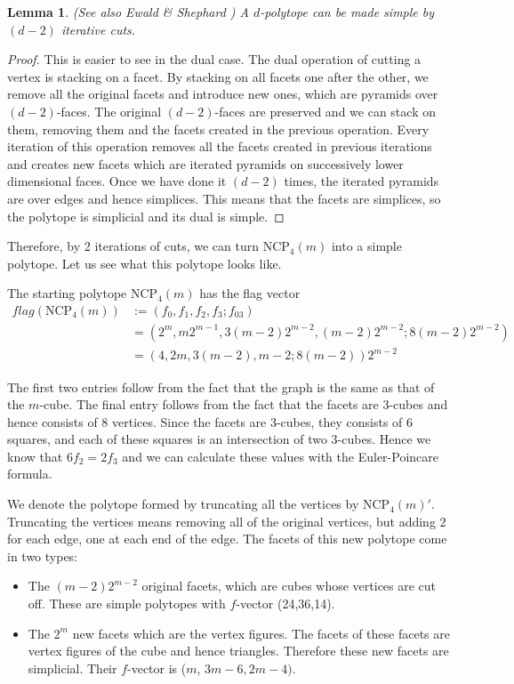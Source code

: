 \documentclass[a4paper,12pt]{book}
\theoremstyle{plain}
\newtheorem{lemma}[theorem]{Lemma}
\theoremstyle{definition}
\newcommand\NC{\textrm{NCP}}
\begin{document}
 

\begin{lemma}
(See also Ewald \& Shephard \cite{EwSh}) A $d$-polytope can be made simple 
by $(d-2)$ iterative cuts.
\end{lemma}

\begin{proof}
This is easier to see in the dual case. The dual operation of cutting a vertex 
is stacking on a facet. By stacking on all facets one after the other, we 
remove all the original facets and introduce new ones, which are pyramids over 
$(d-2)$-faces. The original $(d-2)$-faces are preserved and we can stack on 
them, removing them and the facets created in the previous operation. Every 
iteration of this operation removes all the facets created in previous 
iterations and creates new facets which are iterated pyramids on successively 
lower dimensional faces. Once we have done it $(d-2)$ times, the iterated 
pyramids are over edges and hence simplices. This means that the facets are 
simplices, so the polytope is simplicial and its dual is simple.
\end{proof}

Therefore, by 2 iterations of cuts, we can turn $\NC_4(m)$ into a simple 
polytope. Let us see what this polytope looks like. 

The starting polytope $\NC_4(m)$ has the flag vector 
\begin{align*}
 flag(\NC_4(m)) &:= (f_0, f_1, f_2, f_3; f_{03}) \\
	&= (2^m, m2^{m-1}, 3(m-2)2^{m-2}, (m-2)2^{m-2}; 8(m-2)2^{m-2}) \\
	&= (4, 2m, 3(m-2), m-2; 8(m-2))2^{m-2}
\end{align*}

The first two entries follow from the fact that the graph is the same as that 
of the $m$-cube. The final entry follows from the fact that the facets are 
3-cubes and hence consists of 8 vertices. Since the facets are 3-cubes, they 
consists of 6 squares, and each of these squares is an intersection of two 
3-cubes. Hence we know that $6f_2 = 2f_3$ and we can calculate these values with 
the Euler-Poincare formula.

We denote the polytope formed by truncating all the vertices by $\NC_4(m)'$.
Truncating the vertices means removing all of the original vertices, but 
adding 2 for each edge, one at each end of the edge. The facets of this new 
polytope come in two types:

\begin{itemize}
 \item The $(m-2)2^{m-2}$ original facets, which are cubes whose vertices are 
cut off. These are simple polytopes with $f$-vector (24,36,14).
 \item The $2^m$ new facets which are the vertex figures. The facets of these 
facets are vertex figures of the cube and hence triangles. Therefore these 
new facets are simplicial. Their $f$-vector is ($m$, 
$3m-6, 2m-4)$.
\end{itemize}
\end{document}
